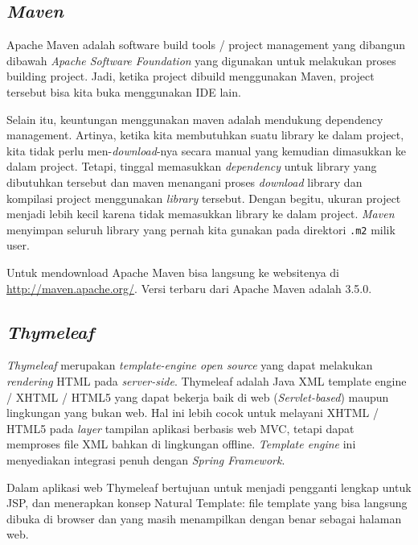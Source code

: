 
\subsection{\textit{Maven} \cite{MengenalMaven2015EGunawan}}
Apache Maven adalah software build tools / project management yang dibangun dibawah \textit{Apache Software Foundation} yang digunakan untuk melakukan proses building project. Jadi, ketika project dibuild menggunakan Maven, project tersebut bisa kita buka menggunakan IDE lain.

Selain itu, keuntungan menggunakan maven adalah mendukung dependency management. Artinya, ketika kita membutuhkan suatu library ke dalam project, kita tidak perlu men-\textit{download}-nya secara manual yang kemudian dimasukkan ke dalam project. Tetapi, tinggal memasukkan \textit{dependency} untuk library yang dibutuhkan tersebut dan maven menangani proses \textit{download} library dan kompilasi project menggunakan \textit{library} tersebut.  Dengan begitu, ukuran project menjadi lebih kecil karena tidak memasukkan library ke dalam project. \textit{Maven} menyimpan seluruh library yang pernah kita gunakan pada direktori \texttt{.m2} milik user.

Untuk mendownload Apache Maven bisa langsung ke websitenya di \url{http://maven.apache.org/}. Versi terbaru dari Apache Maven adalah 3.5.0.

\subsection{\textit{Thymeleaf} \cite{CogoluegnesIntroducing:2013}}
\textit{Thymeleaf} merupakan \textit{template-engine open source} yang dapat melakukan \textit{rendering} HTML pada \textit{server-side}. Thymeleaf adalah Java XML template engine / XHTML / HTML5 yang dapat bekerja baik di web (\textit{Servlet-based}) maupun lingkungan yang bukan web. Hal ini lebih cocok untuk melayani XHTML / HTML5 pada \textit{layer} tampilan aplikasi berbasis web MVC, tetapi dapat memproses file XML bahkan di lingkungan offline. \textit{Template engine} ini menyediakan integrasi penuh dengan \textit{Spring Framework}. 

Dalam aplikasi web Thymeleaf bertujuan untuk menjadi pengganti lengkap untuk JSP, dan menerapkan konsep Natural Template: file template yang bisa langsung dibuka di browser dan yang masih menampilkan dengan benar sebagai halaman web.

